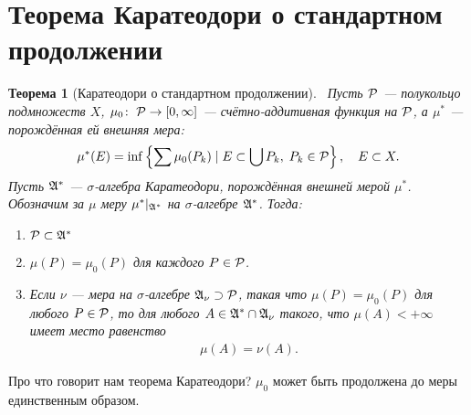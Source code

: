 \documentclass[a4paper,14pt]{extarticle}
\newcounter{theoremCnt}
\theoremstyle{definition}
\theoremstyle{plain}
\newtheorem{thm}[theoremCnt]{Теорема}
\theoremstyle{plain}
\theoremstyle{plain}
\theoremstyle{plain}
\theoremstyle{definition}
\theoremstyle{definition}
\theoremstyle{definition}
\theoremstyle{definition}
\theoremstyle{definition}
\theoremstyle{definition}
\theoremstyle{plain}
\theoremstyle{plain}
\theoremstyle{plain}
\theoremstyle{plain}
\theoremstyle{definition}
\theoremstyle{definition}
\theoremstyle{definition}
\theoremstyle{definition}
\theoremstyle{definition}
\newcommand{\A}{\ensuremath \mathfrak{A}}
\newcommand{\p}{\ensuremath \mathcal{P}}
\begin{document}
\section{Теорема Каратеодори о стандартном продолжении}
\begin{thm}[Каратеодори о стандартном продолжении]\
 Пусть $ \p $ --- полукольцо подмножеств $ X $, $ \mu_0 \colon\; \p \to [0, \infty] $ --- счётно-аддитивная функция на $ \p $, а $ \mu^\ast $ --- порождённая ей внешняя мера:
 \begin{align*}
  \mu^\ast(E) = \inf \left\{ \sum \mu_0(P_k) \mid E \subset \bigcup P_k,\; P_k \in \p \right\}, \quad E \subset X
 .\end{align*} Пусть $ \A^\ast $ --- $ \sigma $-алгебра Каратеодори, порождённая внешней мерой $ \mu^\ast $. Обозначим за $ \mu $ меру $ \mu^\ast \rvert_{\A^\ast} $ на $ \sigma $-алгебре $ \A^\ast $. Тогда:
 \begin{enumerate}
  \item $ \p \subset \A^\ast $
  \item $ \mu(P) = \mu_0(P) $ для каждого $ P \in \p $.
  \item Если $ \nu $ --- мера на $ \sigma $-алгебре $ \A_\nu \supset \p $, такая что $ \mu(P) = \mu_0(P) $ для любого $ P \in \p $, то для любого $ A \in \A^\ast \cap \A_\nu $ такого, что $ \mu(A) < +\infty $ имеет место равенство
   \begin{align*}
    \mu(A) = \nu(A)
   .\end{align*}
 \end{enumerate}
\end{thm}
Про что говорит нам теорема Каратеодори? $ \mu_0 $ может быть продолжена до меры единственным образом.
\end{document}
